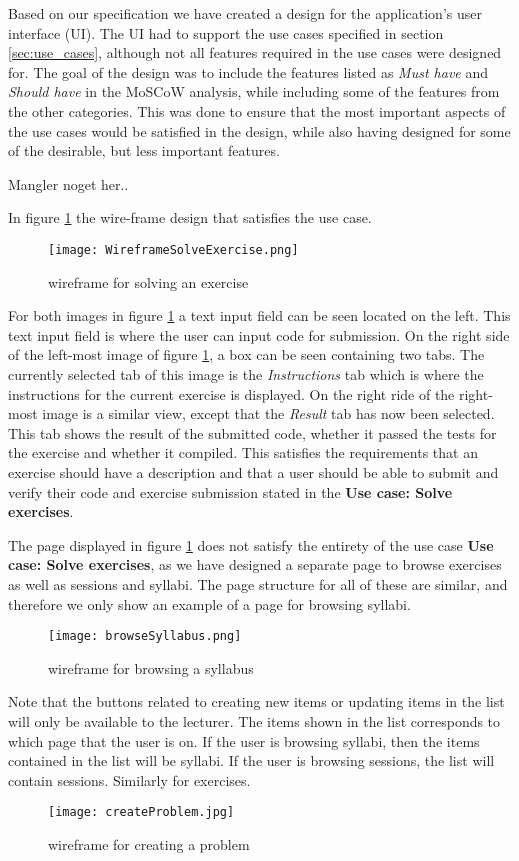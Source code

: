 
Based on our specification we have created a design for the application's user interface (UI). The UI had to support the use cases specified in section \ref*{sec:use_cases}, although not all features required in the use cases were designed for. The goal of the design was to include the features listed as \textit{Must have} and \textit{Should have} in the MoSCoW analysis, while including some of the features from the other categories. This was done to ensure that the most important aspects of the use cases would be satisfied in the design, while also having designed for some of the desirable, but less important features.

Mangler noget her..

In figure \ref{fig:wfExercise} the wire-frame design that satisfies the use case.
\begin{figure}[H]
	\texttt{[image: WireframeSolveExercise.png]}
	\centering
	\caption{wireframe for solving an exercise}
	\label{fig:wfExercise}
\end{figure}

For both images in figure \ref{fig:wfExercise} a text input field can be seen located on the left. This text input field is where the user can input code for submission. On the right side of the left-most image of figure \ref{fig:wfExercise}, a box can be seen containing two tabs. The currently selected tab of this image is the \textit{Instructions} tab which is where the instructions for the current exercise is displayed. On the right ride of the right-most image is a similar view, except that the \textit{Result} tab has now been selected. This tab shows the result of the submitted code, whether it passed the tests for the exercise and whether it compiled. This satisfies the requirements that an exercise should have a description and that a user should be able to submit and verify their code and exercise submission stated in the \textbf{Use case: Solve exercises}.

The page displayed in figure \ref{fig:wfExercise} does not satisfy the entirety of the use case \textbf{Use case: Solve exercises}, as we have designed a separate page to browse exercises as well as sessions and syllabi. The page structure for all of these are similar, and therefore we only show an example of a page for browsing syllabi.
\begin{figure}[H]
    \texttt{[image: browseSyllabus.png]}
    \centering
    \caption{wireframe for browsing a syllabus}
    \label{fig:wfSyllabus}
\end{figure}
Note that the buttons related to creating new items or updating items in the list will only be available to the lecturer. The items shown in the list corresponds to which page that the user is on. If the user is browsing syllabi, then the items contained in the list will be syllabi. If the user is browsing sessions, the list will contain sessions. Similarly for exercises.
\begin{figure}[H]
	\texttt{[image: createProblem.jpg]}
	\centering
	\caption{wireframe for creating a problem}
	\label{fig:wfProblem}
\end{figure}


